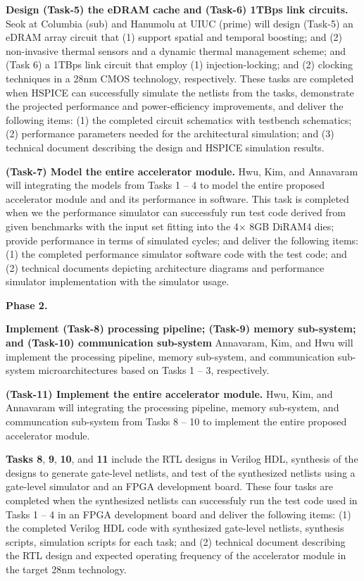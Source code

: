 \noindent
\textbf{Design (Task-5) the eDRAM cache and (Task-6) 1TBps link circuits.}
Seok at Columbia (sub) and Hanumolu at UIUC (prime) will design 
(Task-5) an eDRAM array circuit that (1) support spatial and temporal boosting; and (2) non-invasive thermal sensors and a dynamic thermal management scheme; and 
(Task 6) a 1TBps link circuit that employ (1) injection-locking; and (2) clocking techniques in a 28nm CMOS technology, respectively.
These tasks are completed when HSPICE can successfully simulate the netlists from the tasks, demonstrate the projected performance and power-efficiency improvements, and deliver the following items:
(1) the completed circuit schematics with testbench schematics; (2) performance parameters needed for the architectural simulation; and (3) technical document describing the design and HSPICE simulation results.


\noindent
\textbf{(Task-7) Model the entire accelerator module.}
Hwu, Kim, and Annavaram will integrating the models from Tasks 1 -- 4 to model the entire proposed accelerator module and and its performance in software. 
This task is completed when we the performance simulator can successfuly run test code derived from given benchmarks with the input set fitting into the 4$\times$ 8GB DiRAM4 dies; provide performance in terms of simulated cycles; and deliver the following items:
(1) the completed performance simulator software code with the test code; and (2) technical documents depicting architecture diagrams and performance simulator implementation with the simulator usage.


\noindent
\textbf{Phase 2.}

\noindent
\textbf{Implement (Task-8) processing pipeline; (Task-9) memory sub-system; and (Task-10) communication sub-system}
Annavaram, Kim, and Hwu will implement the processing pipeline, memory sub-system, and communication sub-system microarchitectures 
based on Tasks 1 -- 3, respectively.


\noindent
\textbf{(Task-11) Implement the entire accelerator module.}
Hwu, Kim, and Annavaram will integrating the processing pipeline, memory sub-system, and communcation sub-system from Tasks 8 -- 10 to implement the entire proposed accelerator module. 


\noindent
\textbf{Tasks 8}, \textbf{9}, \textbf{10}, and \textbf{11} include the RTL designs in Verilog HDL, synthesis of the designs to generate gate-level netlists, and test of the synthesized netlists using a gate-level simulator and an FPGA development board.
These four tasks are completed when the synthesized netlists can successfuly run the test code used in Tasks 1 -- 4 in an FPGA development board and deliver the following items:
(1) the completed Verilog HDL code with synthesized gate-level netlists, synthesis scripts, simulation scripts for each task; and (2) technical document describing the RTL design and expected operating frequency of the accelerator module in the target 28nm technology.



